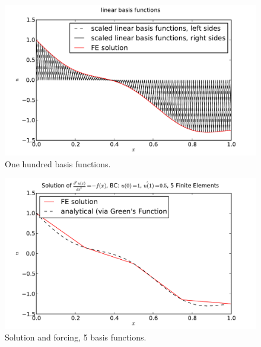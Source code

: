 \documentclass[10pt]{article}
\begin{document}
\begin{figure}[ht]
    \centering
    \includegraphics[width=\columnwidth,keepaspectratio=true]{./hw7-basis_functions-N100.pdf}
    \caption{One hundred basis functions.}
    \label{fig:N100}
\end{figure}

\begin{figure}[ht]
    \centering
    \includegraphics[width=\columnwidth,keepaspectratio=true]{./hw7-solution_and_forcing-N5.pdf}
    \caption{Solution and forcing, 5 basis functions.}
    \label{fig:sf5}
\end{figure}
\end{document}
